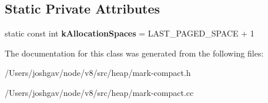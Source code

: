 \subsection*{Static Private Attributes}
\begin{DoxyCompactItemize}
\item 
static const int {\bfseries k\+Allocation\+Spaces} = L\+A\+S\+T\+\_\+\+P\+A\+G\+E\+D\+\_\+\+S\+P\+A\+CE + 1\hypertarget{classv8_1_1internal_1_1_mark_compact_collector_1_1_sweeper_a53d47e0e635be5f9c8dba478b413017e}{}\label{classv8_1_1internal_1_1_mark_compact_collector_1_1_sweeper_a53d47e0e635be5f9c8dba478b413017e}

\end{DoxyCompactItemize}


The documentation for this class was generated from the following files\+:\begin{DoxyCompactItemize}
\item 
/\+Users/joshgav/node/v8/src/heap/mark-\/compact.\+h\item 
/\+Users/joshgav/node/v8/src/heap/mark-\/compact.\+cc\end{DoxyCompactItemize}
